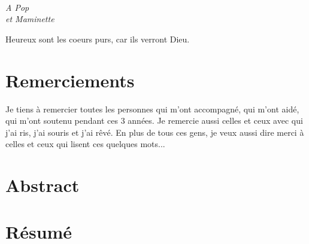 \documentclass[a4paper]{book}
\begin{document}

\cleardoublepage\normalsize
\ 
\vfill
\begin{FlushRight}\itshape
A Pop\\
et Maminette

\vfill\normalshape
Heureux sont les coeurs purs, car ils verront Dieu. %


\end{FlushRight}

\newpage


\chapter*{Remerciements}
\pagestyle{plain}
Je tiens à remercier toutes les personnes qui m'ont accompagné, qui m'ont aidé, qui m'ont soutenu pendant ces 3 années. Je remercie aussi celles et ceux avec qui j'ai ris, j'ai souris et j'ai rêvé. 
En plus de tous ces gens, je veux aussi dire merci à celles et ceux qui lisent ces quelques mots...


\newpage

\chapter*{Abstract}
  \vspace*{0.5cm}
\begin{mdframed}[linecolor=white]
  \begin{mdframed}[linecolor=white]
  \abstractEN 
\end{mdframed} 
\end{mdframed}






\chapter*{Résumé}
\vspace*{0.5cm}
\begin{mdframed}[linecolor=white]
  \begin{mdframed}[linecolor=white]
\abstractFR
\end{mdframed} 
\end{mdframed}
\end{document}
